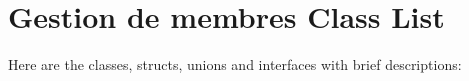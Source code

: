 \section{Gestion de membres Class List}
Here are the classes, structs, unions and interfaces with brief descriptions:\begin{CompactList}
\item{}
\item{}
\end{CompactList}
